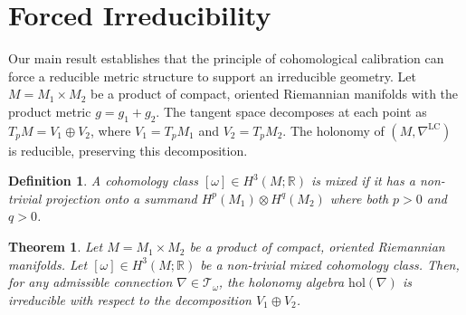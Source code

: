 \documentclass[12pt]{article}
\newtheorem{theorem}{Theorem}[section]
\newtheorem{definition}{Definition}[section]
\begin{document}
\section{Forced Irreducibility}

Our main result establishes that the principle of cohomological calibration can force a reducible metric structure to support an irreducible geometry. Let $M = M_1 \times M_2$ be a product of compact, oriented Riemannian manifolds with the product metric $g = g_1 + g_2$. The tangent space decomposes at each point as $T_pM = V_1 \oplus V_2$, where $V_1 = T_pM_1$ and $V_2 = T_pM_2$. The holonomy of $(M, \nabla^{\mathrm{LC}})$ is reducible, preserving this decomposition.

\begin{definition}
A cohomology class $[\omega] \in H^3(M; \mathbb{R})$ is mixed if it has a non-trivial projection onto a summand $H^p(M_1) \otimes H^q(M_2)$ where both $p > 0$ and $q > 0$.
\end{definition}

\begin{theorem} \label{thm:main}
Let $M = M_1 \times M_2$ be a product of compact, oriented Riemannian manifolds. Let $[\omega] \in H^3(M; \mathbb{R})$ be a non-trivial mixed cohomology class. Then, for any admissible connection $\nabla \in \mathcal{T}_\omega$, the holonomy algebra $\mathrm{hol}(\nabla)$ is irreducible with respect to the decomposition $V_1 \oplus V_2$.
\end{theorem}
\end{document}
